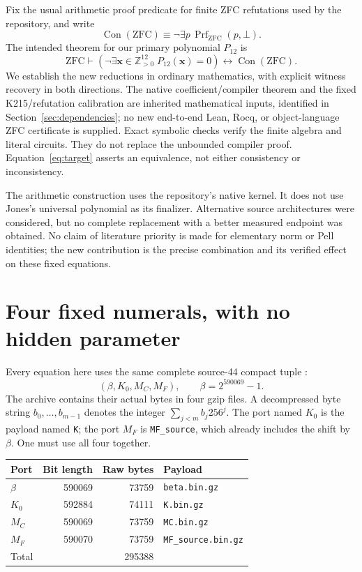 \documentclass[11pt]{article}
\newcommand{\Zp}{\mathbb Z_{>0}}
\newcommand{\Con}{\operatorname{Con}}
\theoremstyle{remark}
\begin{document}
Fix the usual arithmetic proof predicate for finite ZFC refutations used by
the repository, and write
\[
 \Con(\mathrm{ZFC})\equiv
 \neg\exists p\,\operatorname{Prf}_{\mathrm{ZFC}}(p,\bot).
\]
The intended theorem for our primary polynomial $P_{12}$ is
\begin{equation}
 \mathrm{ZFC}\vdash
 \left(\neg\exists\mathbf x\in\Zp^{12}\;P_{12}(\mathbf x)=0\right)
 \longleftrightarrow \Con(\mathrm{ZFC}).
 \label{eq:target}
\end{equation}
We establish the new reductions in ordinary mathematics, with explicit
witness recovery in both directions. The native coefficient/compiler theorem
and the fixed K215/refutation calibration are inherited mathematical inputs,
identified in Section~\ref{sec:dependencies}; no new end-to-end Lean, Rocq,
or object-language ZFC certificate is supplied. Exact symbolic checks verify
the finite algebra and literal circuits. They do not replace the unbounded
compiler proof. Equation~\eqref{eq:target} asserts an equivalence, not either
consistency or inconsistency.

The arithmetic construction uses the repository's native kernel. It does
not use Jones's universal polynomial as its finalizer. Alternative source
architectures were considered, but no complete replacement with a better
measured endpoint was obtained. No claim of literature priority is made for
elementary norm or Pell identities; the new contribution is the precise
combination and its verified effect on these fixed equations.

\section{Four fixed numerals, with no hidden parameter}
\label{sec:coefficients}

Every equation here uses the same complete source-44 compact tuple
\cite{source44}:
\[
 (\beta,K_0,M_C,M_F),\qquad \beta=2^{590069}-1.
\]
The archive contains their actual bytes in four gzip files. A decompressed
byte string $b_0,\ldots,b_{m-1}$ denotes the integer
$\sum_{j<m}b_j256^j$. The port named $K_0$ is the payload named
\texttt{K}; the port $M_F$ is \texttt{MF\_source}, which already includes
the shift by $\beta$. One must use all four together.

\begin{center}
\begin{tabular}{@{}lrrl@{}}
\toprule
Port & Bit length & Raw bytes & Payload\\
\midrule
$\beta$ & 590069 & 73759 & \texttt{beta.bin.gz}\\
$K_0$ & 592884 & 74111 & \texttt{K.bin.gz}\\
$M_C$ & 590069 & 73759 & \texttt{MC.bin.gz}\\
$M_F$ & 590070 & 73759 & \texttt{MF\_source.bin.gz}\\
\midrule
Total & & 295388 &\\
\bottomrule
\end{tabular}
\end{center}
\end{document}
